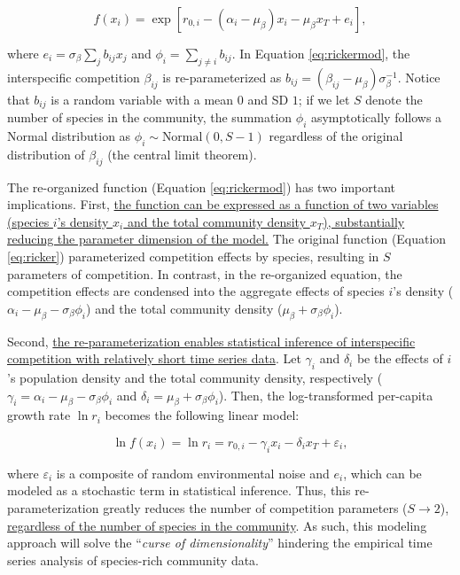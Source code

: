 \documentclass[12pt, class=article, crop=false]{standalone}
\begin{document}
\begin{equation}
\label{eq:rickermod}
f(x_i) = \exp\left[r_{0,i} - (\alpha_i - \mu_{\beta}) x_i - \mu_{\beta} x_T + e_i \right],
\end{equation}

where $e_i = \sigma_{\beta} \sum_{j} b_{ij} x_j$ and $\phi_i = \sum_{j \ne i} b_{ij}$.
In Equation \ref{eq:rickermod}, the interspecific competition $\beta_{ij}$ is re-parameterized as $b_{ij} = (\beta_{ij} - \mu_{\beta}) \sigma_{\beta}^{-1}$.
Notice that $b_{ij}$ is a random variable with a mean $0$ and SD $1$; if we let $S$ denote the number of species in the community, the summation $\phi_i$ asymptotically follows a Normal distribution as $\phi_i \sim \mbox{Normal}(0, S - 1)$ regardless of the original distribution of $\beta_{ij}$ (the central limit theorem).

The re-organized function (Equation \ref{eq:rickermod}) has two important implications.
First, \ul{the function can be expressed as a function of two variables (species $i$'s density $x_i$ and the total community density $x_T$), substantially reducing the parameter dimension of the model.}
The original function (Equation \ref{eq:ricker}) parameterized competition effects by species, resulting in $S$ parameters of competition.
In contrast, in the re-organized equation, the competition effects are condensed into the aggregate effects of species $i$'s density ($\alpha_i - \mu_{\beta} - \sigma_{\beta} \phi_i$) and the total community density ($\mu_{\beta} + \sigma_{\beta} \phi_i$).

Second, \ul{the re-parameterization enables statistical inference of interspecific competition with relatively short time series data}.
Let $\gamma_i$ and $\delta_i$ be the effects of $i$'s population density and the total community density, respectively ($\gamma_i = \alpha_i - \mu_{\beta} - \sigma_{\beta} \phi_i$ and $\delta_i = \mu_{\beta} + \sigma_{\beta} \phi_i$).
Then, the log-transformed per-capita growth rate $\ln r_i$ becomes the following linear model:

\begin{equation}
\label{eq:rickerlog}
    \ln f(x_i) = \ln r_i = r_{0,i} - \gamma_i x_i - \delta_i x_T + \varepsilon_i,
\end{equation}

where $\varepsilon_i$ is a composite of random environmental noise and $e_i$, which can be modeled as a stochastic term in statistical inference. Thus, this re-parameterization greatly reduces the number of competition parameters ($S \rightarrow 2$), \ul{regardless of the number of species in the community}.
As such, this modeling approach will solve the ``\textit{curse of dimensionality}'' hindering the empirical time series analysis of species-rich community data.
\end{document}
